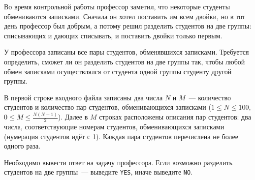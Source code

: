 Во время контрольной работы профессор заметил,
что некоторые студенты обмениваются записками.
Сначала он хотел поставить им всем двойки,
но в тот день профессор был добрым,
а потому решил разделить студентов на две группы:
списывающих и дающих списывать, и поставить двойки только первым.

У профессора записаны все пары студентов, обменявшихся записками.
Требуется определить, сможет ли он разделить студентов на две группы так,
чтобы любой обмен записками осуществлялся от студента одной группы
студенту другой группы.

\InputFile
В первой строке входного файла записаны два числа $N$ и $M$~---
количество студентов и количество пар студентов, обменивающихся записками
($1\le N\le 100$, $0\le M\le \frac{N(N-1)}{2}$).
Далее в $M$ строках расположены описания пар студентов:
два числа, соответствующие номерам студентов, обменивающихся записками
(нумерация студентов идёт с 1). Каждая пара студентов перечислена
не более одного раза.

\OutputFile
Необходимо вывести ответ на задачу профессора.
Если возможно разделить студентов на две группы~--- выведите \verb"YES",
иначе выведите \verb"NO".
